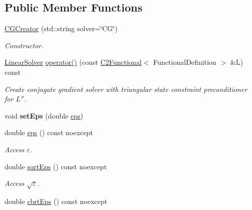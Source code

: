 \subsection*{Public Member Functions}
\begin{DoxyCompactItemize}
\item 
\hyperlink{classSpacy_1_1Kaskade_1_1Lagrange_1_1CGCreator_a238054bebf7f15f35b159a3e1804839d}{C\+G\+Creator} (std\+::string solver=\char`\"{}CG\char`\"{})
\begin{DoxyCompactList}\small\item\em Constructor. \end{DoxyCompactList}\item 
\hyperlink{namespaceSpacy_adcd0d78166a9c972b8a2e5a689fc2d03}{Linear\+Solver} \hyperlink{classSpacy_1_1Kaskade_1_1Lagrange_1_1CGCreator_aa9c6be1ff4b871694dc24d026d7d352b}{operator()} (const \hyperlink{classSpacy_1_1Kaskade_1_1C2Functional}{C2\+Functional}$<$ Functional\+Definition $>$ \&L) const 
\begin{DoxyCompactList}\small\item\em Create conjugate gradient solver with triangular state constraint preconditioner for $L''$. \end{DoxyCompactList}\item 
void {\bfseries set\+Eps} (double \hyperlink{classSpacy_1_1Mixin_1_1Eps_a40e2ba8f3abd2b5370ef41238cfaaf8b}{eps})\hypertarget{classSpacy_1_1Mixin_1_1Eps_a1bbfd62541610d5d80f2782ab77158e4}{}\label{classSpacy_1_1Mixin_1_1Eps_a1bbfd62541610d5d80f2782ab77158e4}

\item 
double \hyperlink{classSpacy_1_1Mixin_1_1Eps_a40e2ba8f3abd2b5370ef41238cfaaf8b}{eps} () const noexcept\hypertarget{classSpacy_1_1Mixin_1_1Eps_a40e2ba8f3abd2b5370ef41238cfaaf8b}{}\label{classSpacy_1_1Mixin_1_1Eps_a40e2ba8f3abd2b5370ef41238cfaaf8b}

\begin{DoxyCompactList}\small\item\em Access $\varepsilon$. \end{DoxyCompactList}\item 
double \hyperlink{classSpacy_1_1Mixin_1_1Eps_a29e8c25dc3f1fdede57b8eb06f520fe1}{sqrt\+Eps} () const noexcept\hypertarget{classSpacy_1_1Mixin_1_1Eps_a29e8c25dc3f1fdede57b8eb06f520fe1}{}\label{classSpacy_1_1Mixin_1_1Eps_a29e8c25dc3f1fdede57b8eb06f520fe1}

\begin{DoxyCompactList}\small\item\em Access $\sqrt\varepsilon$. \end{DoxyCompactList}\item 
double \hyperlink{classSpacy_1_1Mixin_1_1Eps_a1879ebbf1b467cb4be36bcc63307018d}{cbrt\+Eps} () const noexcept\hypertarget{classSpacy_1_1Mixin_1_1Eps_a1879ebbf1b467cb4be36bcc63307018d}{}\label{classSpacy_1_1Mixin_1_1Eps_a1879ebbf1b467cb4be36bcc63307018d}


\end{DoxyCompactItemize}
